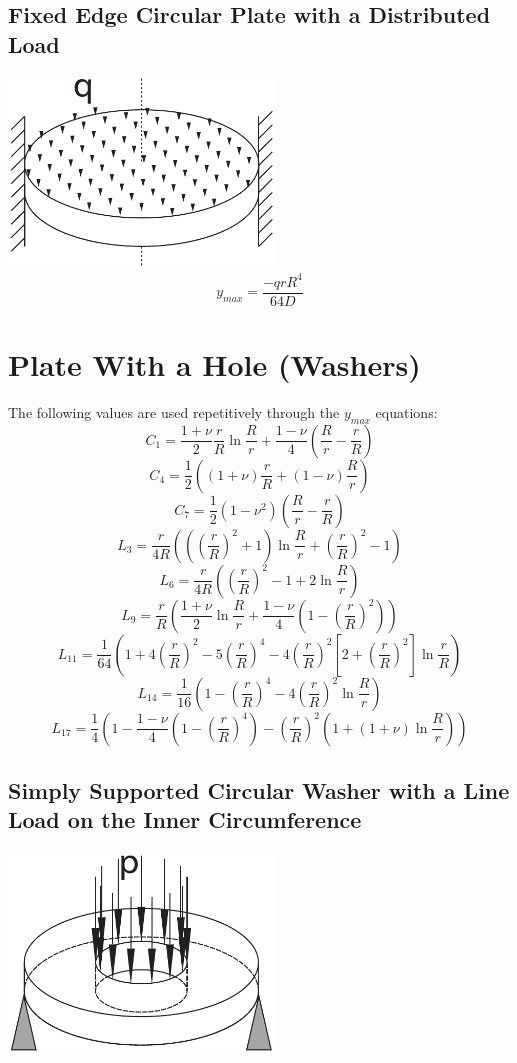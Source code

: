 \documentclass[10pt,letterpaper]{report}
\numberwithin{equation}{chapter}
\begin{document}
\subsection{Fixed Edge Circular Plate with a Distributed Load}
\includegraphics[width=200pt]{3D_fixed_pressure_NoHole.pdf}
\[y_{max} = \frac{-q rR^4}{64D}\]

\section{Plate With a Hole (Washers)}
The following values are used repetitively through the $y_{max}$ equations:
\[C_1 = \frac{1+\nu}{2}\frac{r}{R} \ln \frac{R}{r}+\frac{1-\nu}{4} \left( \frac{R}{r} - \frac{r}{R}\right)\]
\[C_4 = \frac{1}{2} \left( (1+\nu)\frac{r}{R} + (1-\nu) \frac{R}{r} \right)\]
\[C_7 = \frac{1}{2} (1-\nu^2)\left( \frac{R}{r} - \frac{r}{R}\right)\]
\[L_3 = \frac{r}{4R}\left( \left(\left( \frac{r}{R} \right) ^2 +1 \right) \ln \frac{R}{r} + \left( \frac{r}{R}\right)^2 -1 \right)\]
\[L_6 = \frac{r}{4R}\left( \left( \frac{r}{R} \right) ^2 -1+2 \ln \frac{R}{r}  \right)\]
\[L_9 = \frac{r}{R}\left( \frac{1+\nu}{2} \ln \frac{R}{r}    + \frac{1-\nu}{4}  \left( 1 - \left( \frac{r}{R} \right) ^2  \right) \right)\]
\[L_{11} = \frac{1}{64} \left(1 + 4 \left( \frac{r}{R}\right)^2 -5\left( \frac{r}{R}\right)^4 -4\left( \frac{r}{R}\right)^2\left[ 2 + \left( \frac{r}{R}\right)^2 \right] \ln  \frac{r}{R} \right) \]
\[L_{14} = \frac{1}{16} \left(1 - \left( \frac{r}{R}\right)^4 - 4\left( \frac{r}{R}\right)^2  \ln  \frac{R}{r}  \right)\]
\[L_{17} =\frac{1}{4} \left( 1 - \frac{1-\nu}{4} \left( 1 - \left( \frac{r}{R} \right) ^4 \right) - \left( \frac{r}{R} \right) ^2 \left( 1 + (1 + \nu ) \ln \frac{R}{r} \right) \right) \]
\subsection{Simply Supported Circular Washer with a Line Load on the Inner Circumference }

\includegraphics[width=200pt]{3D_pinned_point_Hole.pdf}
\end{document}
